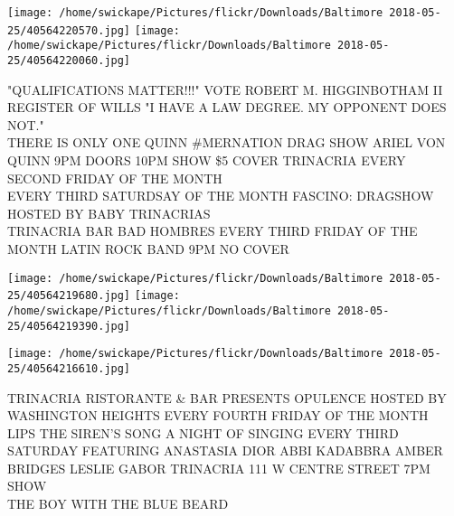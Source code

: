 \documentclass[10pt,letterpaper]{article}
\begin{document}
\texttt{[image: /home/swickape/Pictures/flickr/Downloads/Baltimore 2018-05-25/40564220570.jpg]}
\texttt{[image: /home/swickape/Pictures/flickr/Downloads/Baltimore 2018-05-25/40564220060.jpg]}

"QUALIFICATIONS MATTER!!!" VOTE ROBERT M. HIGGINBOTHAM II REGISTER OF WILLS "I HAVE A LAW DEGREE.  MY OPPONENT DOES NOT."\\
THERE IS ONLY ONE QUINN \#MERNATION DRAG SHOW ARIEL VON QUINN 9PM DOORS 10PM SHOW \$5 COVER TRINACRIA EVERY SECOND FRIDAY OF THE MONTH\\
EVERY THIRD SATURDSAY OF THE MONTH FASCINO: DRAGSHOW HOSTED BY BABY TRINACRIAS\\
TRINACRIA BAR BAD HOMBRES EVERY THIRD FRIDAY OF THE MONTH LATIN ROCK BAND 9PM NO COVER\\
\pagebreak

\texttt{[image: /home/swickape/Pictures/flickr/Downloads/Baltimore 2018-05-25/40564219680.jpg]}
\texttt{[image: /home/swickape/Pictures/flickr/Downloads/Baltimore 2018-05-25/40564219390.jpg]}

\texttt{[image: /home/swickape/Pictures/flickr/Downloads/Baltimore 2018-05-25/40564216610.jpg]}

TRINACRIA RISTORANTE \& BAR PRESENTS OPULENCE HOSTED BY WASHINGTON HEIGHTS EVERY FOURTH FRIDAY OF THE MONTH\\
LIPS THE SIREN'S SONG A NIGHT OF SINGING EVERY THIRD SATURDAY FEATURING ANASTASIA DIOR ABBI KADABBRA AMBER BRIDGES LESLIE GABOR TRINACRIA 111 W CENTRE STREET 7PM SHOW\\
THE BOY WITH THE BLUE BEARD\\
\pagebreak
\end{document}
